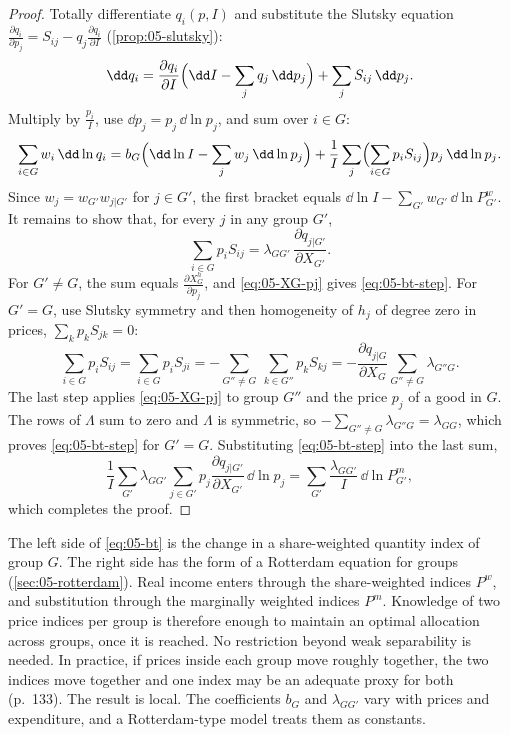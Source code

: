 \begin{proof}
Totally differentiate $q_i(p, I)$ and substitute the Slutsky equation $\frac{\partial q_i}{\partial p_j} =
S_{ij} - q_j\frac{\partial q_i}{\partial I}$ (\cref{prop:05-slutsky}):
\begin{equation*}
  \dd q_i = \frac{\partial q_i}{\partial I}\Bigl(\dd I - \sum_j q_j\,\dd p_j\Bigr) + \sum_j S_{ij}\,\dd p_j .
\end{equation*}
Multiply by $\frac{p_i}{I}$, use $\dd p_j = p_j\,\dd\ln p_j$, and sum over $i \in G$:
\begin{equation*}
  \sum_{i \in G} w_i\,\dd\ln q_i = b_G\Bigl(\dd\ln I - \sum_j w_j\,\dd\ln p_j\Bigr)
  + \frac{1}{I}\sum_j\Bigl(\sum_{i \in G} p_iS_{ij}\Bigr)p_j\,\dd\ln p_j .
\end{equation*}
Since $w_j = w_{G'}w_{j|G'}$ for $j \in G'$, the first bracket equals $\dd\ln I - \sum_{G'}
w_{G'}\,\dd\ln P^{w}_{G'}$. It remains to show that, for every $j$ in any group $G'$,
\begin{equation}\label{eq:05-bt-step}
  \sum_{i \in G} p_iS_{ij} = \lambda_{GG'}\,\frac{\partial q_{j|G'}}{\partial X_{G'}} .
\end{equation}
For $G' \neq G$, the sum equals $\frac{\partial X_G^h}{\partial p_j}$, and \eqref{eq:05-XG-pj} gives
\eqref{eq:05-bt-step}. For $G' = G$, use Slutsky symmetry and then homogeneity of $h_j$ of degree zero in
prices, $\sum_k p_kS_{jk} = 0$:
\begin{equation*}
  \sum_{i \in G} p_iS_{ij} = \sum_{i \in G} p_iS_{ji} = -\sum_{G'' \neq G}\ \sum_{k \in G''} p_kS_{kj}
  = -\frac{\partial q_{j|G}}{\partial X_G}\sum_{G'' \neq G}\lambda_{G''G} .
\end{equation*}
The last step applies \eqref{eq:05-XG-pj} to group $G''$ and the price $p_j$ of a good in $G$. The rows
of $\Lambda$ sum to zero and $\Lambda$ is symmetric, so $-\sum_{G'' \neq G}\lambda_{G''G} = \lambda_{GG}$,
which proves \eqref{eq:05-bt-step} for $G' = G$. Substituting \eqref{eq:05-bt-step} into the last sum,
\begin{equation*}
  \frac{1}{I}\sum_{G'}\lambda_{GG'}\sum_{j \in G'} p_j\frac{\partial q_{j|G'}}{\partial X_{G'}}\,\dd\ln p_j
  = \sum_{G'}\frac{\lambda_{GG'}}{I}\,\dd\ln P^{m}_{G'} ,
\end{equation*}
which completes the proof.
\end{proof}

The left side of \eqref{eq:05-bt} is the change in a share-weighted quantity index of group $G$. The
right side has the form of a Rotterdam equation for groups (\cref{sec:05-rotterdam}). Real income enters
through the share-weighted indices $P^w$, and substitution through the marginally weighted indices $P^m$.
Knowledge of two price indices per group is therefore enough to maintain an optimal allocation across
groups, once it is reached. No restriction beyond weak separability is needed. In practice, if prices
inside each group move roughly together, the two indices move together and one index may be an adequate
proxy for both (p.~133). The result is local. The coefficients $b_G$ and $\lambda_{GG'}$ vary with prices and
expenditure, and a Rotterdam-type model treats them as constants.

